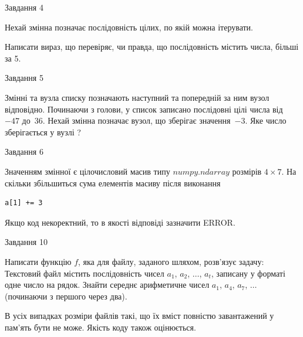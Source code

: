 \documentclass[12pt, ukrainian]{article}
\begin{document}
{\begin{minipage}[t]{8.0cm}
\end{minipage}


               
{\begin{center}Завдання {4}\end{center}}
\vspace{-4mm}
Нехай змінна  позначає послідовність цілих, по якій можна ітерувати.

Написати вираз, що перевіряє, чи правда, що послідовність  містить числа, більші за 5.\par

\vspace{10mm}
               
{\begin{center}Завдання {5}\end{center}}
\vspace{-4mm}
Змінні  та  вузла списку позначають наступний та попередній за ним вузол відповідно. Починаючи з голови, у список записано послідовні цілі числа від~$-47$ до~$36$. Нехай змінна  позначає вузол, що зберігає значення~$-3$.
Яке число зберігається у вузлі  ?\par

               
{\begin{center}Завдання {6}\end{center}}
\vspace{-4mm}
Значенням змінної  є цілочисловий масив типу $numpy.ndarray$ розмірів $4{\times}7$. На скільки збільшиться сума елементів масиву  після виконання
\begin{verbatim}
a[1] += 3
\end{verbatim}


Якщо код некоректний, то в якості відповіді зазначити ERROR.\par

               
{\begin{center}Завдання {10}\end{center}}
\vspace{-4mm}

Написати функцію $f$, яка для файлу, заданого шляхом, розв’язує задачу:\\ Текстовий файл містить послідовність чисел $a_1$, $a_2$, $\ldots$, $a_t$, записану у форматі одне число на рядок. Знайти середнє арифметичне чисел $a_1$, $a_4$, $a_7$, $\ldots$ (починаючи з першого через два).

В усіх випадках розміри файлів такі, що їх вміст повністю завантажений у пам'ять бути не може. Якість коду також оцінюється.



}
\end{document}
